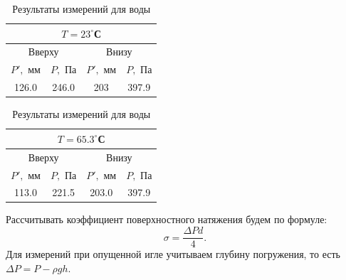 \documentclass[a4paper,12pt]{article}
\theoremstyle{definition}
\begin{document}
	\begin{table}[H]
		\centering
		\begin{minipage}{.49\linewidth}
			\centering
			\bgroup
			\def\arraystretch{1.2}
				\begin{tabular}{|c|c|c|c|}
					\hline
					\multicolumn{4}{|c|}{$T = 23 ^\circ$С}\\
					\hline
					\multicolumn{2}{|c|}{Вверху}&\multicolumn{2}{c|}{Внизу}\\
					\hline
					$P',$ мм& $P,$ Па &$P',$ мм& $P,$ Па\\
					\hline
					126.0&246.0&203&397.9\\
					\hline
				\end{tabular}
			\egroup
		\end{minipage}
		\begin{minipage}{.49\linewidth}
			\centering
			\bgroup
			\def\arraystretch{1.2}%
				\begin{tabular}{|c|c|c|c|}
					\hline
					\multicolumn{4}{|c|}{$T = 65.3 ^\circ$С}\\
					\hline
					\multicolumn{2}{|c|}{Вверху}&\multicolumn{2}{c|}{Внизу}\\
					\hline
					$P',$ мм& $P,$ Па &$P',$ мм& $P,$ Па\\
					\hline
					113.0& 221.5&203.0&397.9\\
					\hline
				\end{tabular}
			\egroup
		\end{minipage}
		\caption{Результаты измерений для воды}
		\label{water}
	\end{table}

	Рассчитывать коэффициент поверхностного натяжения будем по формуле:
	\begin{equation*}
		\sigma = \frac{\Delta P d}{4}.
	\end{equation*}
	Для измерений при опущенной игле учитываем глубину погружения, то есть $\Delta P = P - \rho g h.$
	
\end{document}
